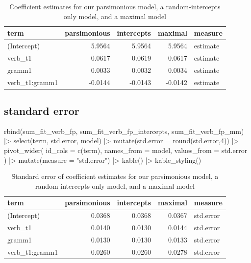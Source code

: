 \documentclass[
  letterpaper,
  DIV=11,
  numbers=noendperiod]{scrartcl}
\newenvironment{Shaded}{\begin{snugshade}}{\end{snugshade}}
\newcommand{\AttributeTok}[1]{\textcolor[rgb]{0.40,0.45,0.13}{#1}}
\newcommand{\DecValTok}[1]{\textcolor[rgb]{0.68,0.00,0.00}{#1}}
\newcommand{\FunctionTok}[1]{\textcolor[rgb]{0.28,0.35,0.67}{#1}}
\newcommand{\NormalTok}[1]{\textcolor[rgb]{0.00,0.23,0.31}{#1}}
\newcommand{\SpecialCharTok}[1]{\textcolor[rgb]{0.37,0.37,0.37}{#1}}
\newcommand{\StringTok}[1]{\textcolor[rgb]{0.13,0.47,0.30}{#1}}
\begin{document}
\hypertarget{tbl-estimates}{}
\begin{longtable}[t]{lrrrl}
\caption{\label{tbl-estimates}Coefficient estimates for our parsimonious model, a random-intercepts
only model, and a maximal model }\tabularnewline

\toprule
term & parsimonious & intercepts & maximal & measure\\
\midrule
(Intercept) & 5.9564 & 5.9564 & 5.9564 & estimate\\
verb\_t1 & 0.0617 & 0.0619 & 0.0617 & estimate\\
gramm1 & 0.0033 & 0.0032 & 0.0034 & estimate\\
verb\_t1:gramm1 & -0.0144 & -0.0143 & -0.0142 & estimate\\
\bottomrule
\end{longtable}

\hypertarget{standard-error}{%
\subsection{standard error}\label{standard-error}}

\begin{Shaded}
\begin{Highlighting}[]
\FunctionTok{rbind}\NormalTok{(sum\_fit\_verb\_fp, sum\_fit\_verb\_fp\_intercepts, sum\_fit\_verb\_fp\_mm) }\SpecialCharTok{|\textgreater{}} 
  \FunctionTok{select}\NormalTok{(term, std.error, model) }\SpecialCharTok{|\textgreater{}}
  \FunctionTok{mutate}\NormalTok{(}\AttributeTok{std.error =} \FunctionTok{round}\NormalTok{(std.error,}\DecValTok{4}\NormalTok{)) }\SpecialCharTok{|\textgreater{}} 
  \FunctionTok{pivot\_wider}\NormalTok{(}
    \AttributeTok{id\_cols =} \FunctionTok{c}\NormalTok{(term),}
    \AttributeTok{names\_from =}\NormalTok{ model,}
    \AttributeTok{values\_from =}\NormalTok{ std.error}
\NormalTok{  ) }\SpecialCharTok{|\textgreater{}} 
  \FunctionTok{mutate}\NormalTok{(}\AttributeTok{measure =} \StringTok{"std.error"}\NormalTok{) }\SpecialCharTok{|\textgreater{}} 
  \FunctionTok{kable}\NormalTok{() }\SpecialCharTok{|\textgreater{}} 
  \FunctionTok{kable\_styling}\NormalTok{()}
\end{Highlighting}
\end{Shaded}

\hypertarget{tbl-std_error}{}
\begin{longtable}[t]{lrrrl}
\caption{\label{tbl-std_error}Standard error of coefficient estimates for our parsimonious model, a
random-intercepts only model, and a maximal model }\tabularnewline

\toprule
term & parsimonious & intercepts & maximal & measure\\
\midrule
(Intercept) & 0.0368 & 0.0368 & 0.0367 & std.error\\
verb\_t1 & 0.0140 & 0.0130 & 0.0144 & std.error\\
gramm1 & 0.0130 & 0.0130 & 0.0133 & std.error\\
verb\_t1:gramm1 & 0.0260 & 0.0260 & 0.0278 & std.error\\
\bottomrule
\end{longtable}
\end{document}
